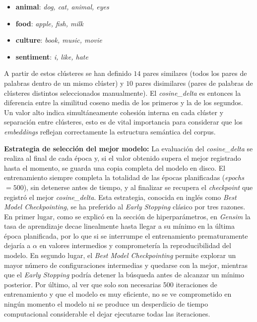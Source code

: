 \begin{itemize}
  \item \textbf{animal}: \textit{dog, cat, animal, eyes}
  \item \textbf{food}: \textit{apple, fish, milk}
  \item \textbf{culture}: \textit{book, music, movie}
  \item \textbf{sentiment}: \textit{i, like, hate}
\end{itemize}

A partir de estos clústeres se han definido $14$ pares similares (todos los pares de palabras dentro de un mismo clúster) y $10$ pares disimilares (pares de palabras de clústeres distintos seleccionados manualmente). El \textit{cosine\_delta} es entonces la diferencia entre la similitud coseno media de los primeros y la de los segundos. Un valor alto indica simultáneamente cohesión interna en cada clúster y separación entre clústeres, esto es de vital importancia para considerar que los \textit{embeddings} reflejan correctamente la estructura semántica del corpus.

\textbf{Estrategia de selección del mejor modelo:} La evaluación del \textit{cosine\_delta} se realiza al final de cada época y, si el valor obtenido supera el mejor registrado hasta el momento, se guarda una copia completa del modelo en disco. El entrenamiento siempre completa la totalidad de las épocas planificadas (\textit{epochs} $= 500$), sin detenerse antes de tiempo, y al finalizar se recupera el \textit{checkpoint} que registró el mejor \textit{cosine\_delta}. Esta estrategia, conocida en inglés como \textit{Best Model Checkpointing}, se ha preferido al \textit{Early Stopping} clásico por tres razones. En primer lugar, como se explicó en la sección de hiperparámetros, en \textit{Gensim} la tasa de aprendizaje decae linealmente hasta llegar a su mínimo en la última época planificada, por lo que si se interrumpe el entrenamiento prematuramente dejaría a $\alpha$ en valores intermedios y comprometería la reproducibilidad del modelo. En segundo lugar, el \textit{Best Model Checkpointing} permite explorar un mayor número de configuraciones intermedias y quedarse con la mejor, mientras que el \textit{Early Stopping} podría detener la búsqueda antes de alcanzar un mínimo posterior. Por último, al ver que solo son necesarias 500 iteraciones de entrenamiento y que el modelo es muy eficiente, no se ve comprometido en ningún momento el modelo ni se produce un desperdicio de tiempo computacional considerable el dejar ejecutarse todas las iteraciones.


